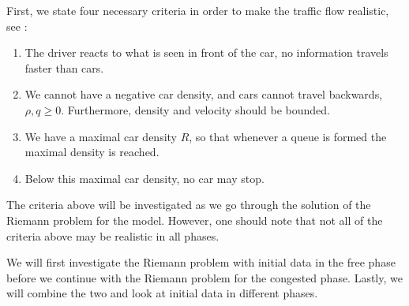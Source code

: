 \documentclass[10pt]{article}
\numberwithin{equation}{section}
\begin{document}
First, we state four necessary criteria in order to make the traffic flow realistic, see \cite{Colombo2002}:
\begin{enumerate}
    \item The driver reacts to what is seen in front of the car, no information travels faster than cars.
    \item We cannot have a negative car density, and cars cannot travel backwards, $\rho, q \geq 0$. Furthermore, density and velocity should be bounded.
    \item We have a maximal car density $R$, so that whenever a queue is formed the maximal density is reached. 
    \item Below this maximal car density, no car may stop.
\end{enumerate} The criteria above will be investigated as we go through the solution of the Riemann problem for the model. However, one should note that not all of the criteria above may be realistic in all phases. 

We will first investigate the Riemann problem with initial data in the free phase before we continue with the Riemann problem for the congested phase. Lastly, we will combine the two and look at initial data in different phases.
\end{document}
